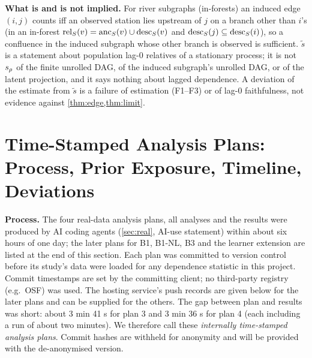 \textbf{What is and is not implied.} For river subgraphs (in-forests) an
induced edge $(i,j)$ counts iff an observed station lies upstream of $j$ on a
branch other than $i$'s (in an in-forest $\mathrm{rel}_S(v)=\mathrm{anc}_S(v)\cup\mathrm{desc}_S(v)$ and
$\mathrm{desc}_S(j)\subseteq\mathrm{desc}_S(i)$), so a confluence in the induced subgraph whose
other branch is observed is sufficient. $\tilde s$ is a statement about
population lag-0 relatives of a stationary process; it is not
$s_\rho$ of the finite unrolled DAG, of the induced subgraph's unrolled DAG, or
of the latent projection, and it says nothing about lagged dependence. A
deviation of the estimate from $\tilde s$ is a failure of estimation (F1--F3)
or of lag-0 faithfulness, not evidence against \cref{thm:edge,thm:limit}.

\section{Time-Stamped Analysis Plans: Process, Prior Exposure, Timeline, Deviations}
\label{app:prereg}

\textbf{Process.} The four real-data analysis plans, all analyses and the
results were produced by AI coding agents (\cref{sec:real}, AI-use statement)
within about six hours of one day; the later plans for B1, B1-NL, B3 and the
learner extension are listed at the end of this section. Each plan was committed to version control before its
study's data were loaded for any dependence statistic in this project. Commit
timestamps are set by the committing client; no third-party registry (e.g.\
OSF) was used. The hosting service's push records are given below for the
later plans and can be supplied for the others. The gap between plan and results
was short: about 3 min 41 s for plan 3 and 3 min 36 s for plan 4 (each
including a run of about two minutes). We therefore call these
\emph{internally time-stamped analysis plans}. Commit hashes are withheld for anonymity and will be
provided with the de-anonymised version.

